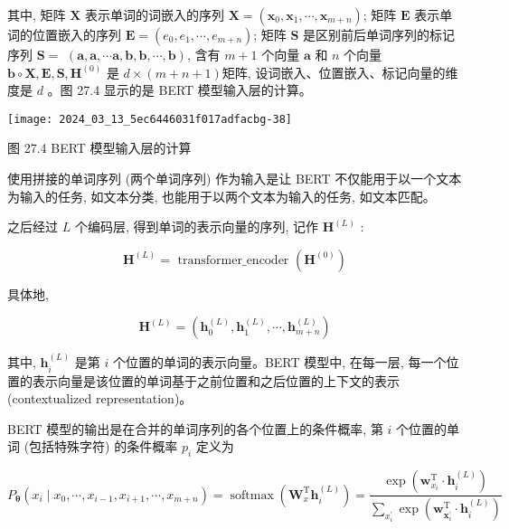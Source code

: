 \documentclass[10pt]{article}
\begin{document}
其中, 矩阵 $\boldsymbol{X}$ 表示单词的词嵌入的序列 $\boldsymbol{X}=\left(\boldsymbol{x}_{0}, \boldsymbol{x}_{1}, \cdots, \boldsymbol{x}_{m+n}\right)$; 矩阵 $\boldsymbol{E}$ 表示单词的位置嵌入的序列 $\boldsymbol{E}=\left(e_{0}, e_{1}, \cdots, e_{m+n}\right)$; 矩阵 $\boldsymbol{S}$ 是区别前后单词序列的标记序列 $\boldsymbol{S}=$ $(\boldsymbol{a}, \boldsymbol{a}, \cdots \boldsymbol{a}, \boldsymbol{b}, \boldsymbol{b}, \cdots, \boldsymbol{b})$, 含有 $m+1$ 个向量 $\boldsymbol{a}$ 和 $n$ 个向量 $\boldsymbol{b} \circ \boldsymbol{X}, \boldsymbol{E}, \boldsymbol{S}, \boldsymbol{H}^{(0)}$ 是 $d \times(m+n+1)$矩阵, 设词嵌入、位置嵌入、标记向量的维度是 $d$ 。图 27.4 显示的是 BERT 模型输入层的计算。

\begin{center}
\texttt{[image: 2024\_03\_13\_5ec6446031f017adfacbg-38]}
\end{center}

图 27.4 BERT 模型输入层的计算

使用拼接的单词序列 (两个单词序列) 作为输入是让 BERT 不仅能用于以一个文本为输入的任务, 如文本分类, 也能用于以两个文本为输入的任务, 如文本匹配。

之后经过 $L$ 个编码层, 得到单词的表示向量的序列, 记作 $\boldsymbol{H}^{(L)}$ :


\begin{equation*}
\boldsymbol{H}^{(L)}=\text { transformer_encoder }\left(\boldsymbol{H}^{(0)}\right) \tag{27.23}
\end{equation*}


具体地,

$$
\boldsymbol{H}^{(L)}=\left(\boldsymbol{h}_{0}^{(L)}, \boldsymbol{h}_{1}^{(L)}, \cdots, \boldsymbol{h}_{m+n}^{(L)}\right)
$$

其中, $\boldsymbol{h}_{i}^{(L)}$ 是第 $i$ 个位置的单词的表示向量。BERT 模型中, 在每一层, 每一个位置的表示向量是该位置的单词基于之前位置和之后位置的上下文的表示 (contextualized representation)。

BERT 模型的输出是在合并的单词序列的各个位置上的条件概率, 第 $i$ 个位置的单词 (包括特殊字符) 的条件概率 $p_{i}$ 定义为


\begin{equation*}
P_{\boldsymbol{\theta}}\left(x_{i} \mid x_{0}, \cdots, x_{i-1}, x_{i+1}, \cdots, x_{m+n}\right)=\operatorname{softmax}\left(\boldsymbol{W}_{x}^{\mathrm{T}} \boldsymbol{h}_{i}^{(L)}\right)=\frac{\exp \left(\boldsymbol{w}_{x_{i}}^{\mathrm{T}} \cdot \boldsymbol{h}_{i}^{(L)}\right)}{\sum_{x_{i}^{\prime}} \exp \left(\boldsymbol{w}_{\boldsymbol{x}_{i}^{\prime}}^{\mathrm{T}} \cdot \boldsymbol{h}_{i}^{(L)}\right)} \tag{27.24}
\end{equation*}
\end{document}

